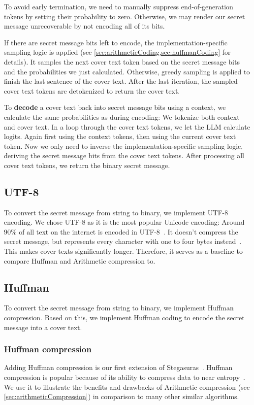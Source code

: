 To avoid early termination, we need to manually suppress end-of-generation tokens by setting their probability to zero. Otherwise, we may render our secret message unrecoverable by not encoding all of its bits.

If there are secret message bits left to encode, the implementation-specific sampling logic is applied (see \cref{sec:arithmeticCoding,sec:huffmanCoding} for details). It samples the next cover text token based on the secret message bits and the probabilities we just calculated. Otherwise, greedy sampling is applied to finish the last sentence of the cover text. After the last iteration, the sampled cover text tokens are detokenized to return the cover text.

To \textbf{decode} a cover text back into secret message bits using a context, we calculate the same probabilities as during encoding: We tokenize both context and cover text. In a loop through the cover text tokens, we let the \gls{LLM} calculate logits. Again first using the context tokens, then using the current cover text token. Now we only need to inverse the implementation-specific sampling logic, deriving the secret message bits from the cover text tokens. After processing all cover text tokens, we return the binary secret message.

\subsection{UTF-8}
\label{sec:utf8}
To convert the secret message from string to binary, we implement UTF-8 encoding. We chose UTF-8 as it is the most popular Unicode encoding: Around 90\% of all text on the internet is encoded in UTF-8~\cite{gleaveMakingCompressionAlgorithms2017}. It doesn't compress the secret message, but represents every character with one to four bytes instead~\cite{gleaveMakingCompressionAlgorithms2017}. This makes cover texts significantly longer. Therefore, it serves as a baseline to compare Huffman and Arithmetic compression to.

\subsection{Huffman}
\label{sec:huffman}
To convert the secret message from string to binary, we implement Huffman compression. Based on this, we implement Huffman coding to encode the secret message into a cover text.

\subsubsection{Huffman compression}
\label{sec:huffmanCompression}
Adding Huffman compression is our first extension of Stegasuras~\cite{zieglerNeuralLinguisticSteganography2019}. Huffman compression is popular because of its ability to compress data to near entropy~\cite{huffmanMethodConstructionMinimumRedundancy1952}. We use it to illustrate the benefits and drawbacks of Arithmetic compression (see \cref{sec:arithmeticCompression}) in comparison to many other similar algorithms.

